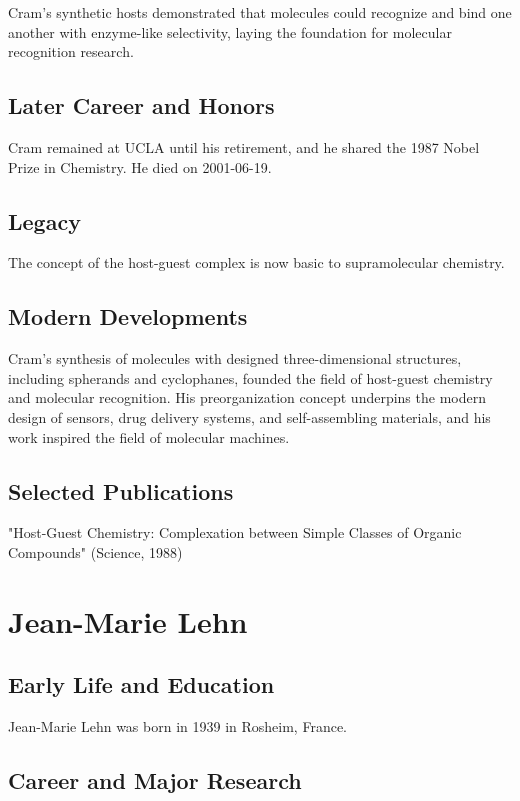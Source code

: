 Cram's synthetic hosts demonstrated that molecules could recognize and bind one another with enzyme-like selectivity, laying the foundation for molecular recognition research.

\subsection*{Later Career and Honors}

Cram remained at UCLA until his retirement, and he shared the 1987 Nobel Prize in Chemistry. He died on 2001-06-19.

\subsection*{Legacy}

The concept of the host-guest complex is now basic to supramolecular chemistry.

\subsection*{Modern Developments}

Cram's synthesis of molecules with designed three-dimensional structures, including spherands and cyclophanes, founded the field of host-guest chemistry and molecular recognition. His preorganization concept underpins the modern design of sensors, drug delivery systems, and self-assembling materials, and his work inspired the field of molecular machines.

\subsection*{Selected Publications}

"Host-Guest Chemistry: Complexation between Simple Classes of Organic Compounds" (Science, 1988)

\clearpage

\section{Jean-Marie Lehn}

\subsection*{Early Life and Education}

Jean-Marie Lehn was born in 1939 in Rosheim, France.

\subsection*{Career and Major Research}

